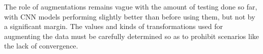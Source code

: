 \documentclass[10pt,twocolumn,letterpaper]{article}
\begin{document}
The role of augmentations remains vague with the amount of testing done so far, with CNN models performing slightly better than before using them, but not by a significant margin. The values and kinds of transformations used for augmenting the data must be carefully determined so as to prohibit scenarios like the lack of convergence.







\end{document}
